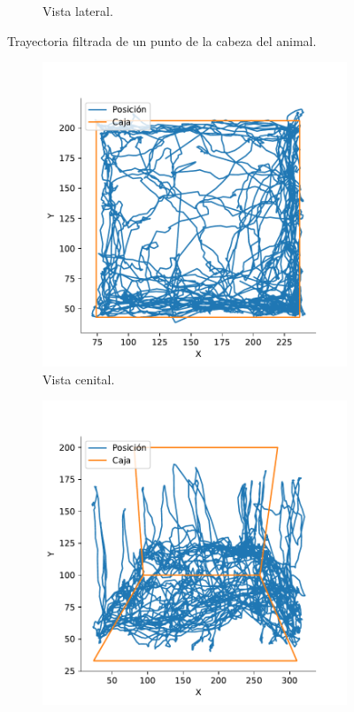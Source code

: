 \begin{figure}[H]
\begin{subfigure}{0.45\textwidth}
    \caption{Vista lateral.}
  \end{subfigure}
  \caption{Trayectoria filtrada de un punto de la cabeza del animal.}
  \label{fig:filtered-trayectories}
\end{figure}

\begin{figure}[H]
  \centering
  \begin{subfigure}{0.45\textwidth}
    \centering
    \includegraphics[width=\textwidth]{figures/interpolated-trayectory-top-4128-2020-12-02.pdf}
    \caption{Vista cenital.}
  \end{subfigure}
  \begin{subfigure}{0.45\textwidth}
    \centering
    \includegraphics[width=\textwidth]{figures/interpolated-trayectory-lateral-4128-2020-12-02.pdf}

\end{subfigure}
\end{figure}
